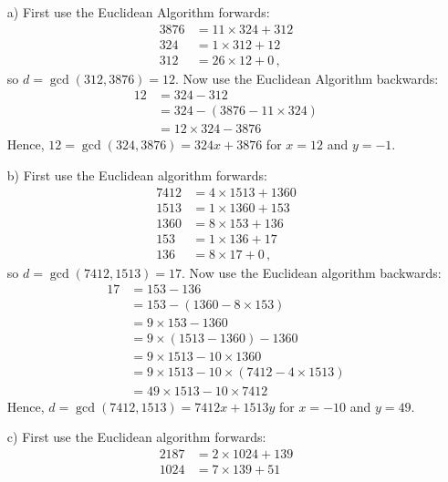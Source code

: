 \documentclass[11pt]{article}
\begin{document}
\bigskip{}
\begin{itemize}
  \item[a)]
    First use the Euclidean Algorithm forwards:
    \begin{align*}
      3876 &= 11\times 324 + 312\\
       324 &=  1\times 312 +  12\\
       312 &= 26\times  12 +   0\,,
    \end{align*}
    so $d = \gcd(312,3876) = 12$.
    Now use the Euclidean Algorithm backwards:
    \begin{align*}
      12 &= 324 -   312\\
         &= 324 - (3876 - 11\times324)\\
         &= 12\times 324 - 3876
    \end{align*}
    Hence, $12 = \gcd(324,3876) = 324x + 3876$ for $x = 12$ and $y = -1$.
  \item[b)]
    First use the Euclidean algorithm forwards:
    \begin{align*}
      7412 &= 4\times 1513 + 1360\\
      1513 &= 1\times 1360 +  153\\
      1360 &= 8\times  153 +  136\\
       153 &= 1\times  136 +   17\\
       136 &= 8\times   17 +  0\,,
    \end{align*}
    so $d = \gcd(7412,1513) = 17$.
    Now use the Euclidean algorithm backwards:
    \begin{align*}
       17 &= 153 - 136\\
          &= 153 - (1360 - 8\times 153)\\
          &=  9\times   153 - 1360\\
          &=  9\times (1513 - 1360) - 1360\\
          &=  9\times  1513 - 10\times1360\\
          &=  9\times  1513 - 10\times(7412 - 4\times 1513)\\
          &= 49\times  1513 - 10\times 7412
    \end{align*}
    Hence, $d = \gcd(7412,1513) = 7412x + 1513y$ for $x = -10$ and $y = 49$.
  \item[c)]
    First use the Euclidean algorithm forwards:
    \begin{align*}
      2187 &= 2\times 1024 + 139\\
      1024 &= 7\times  139 +  51\\

\end{align*}
\end{itemize}
\end{document}
